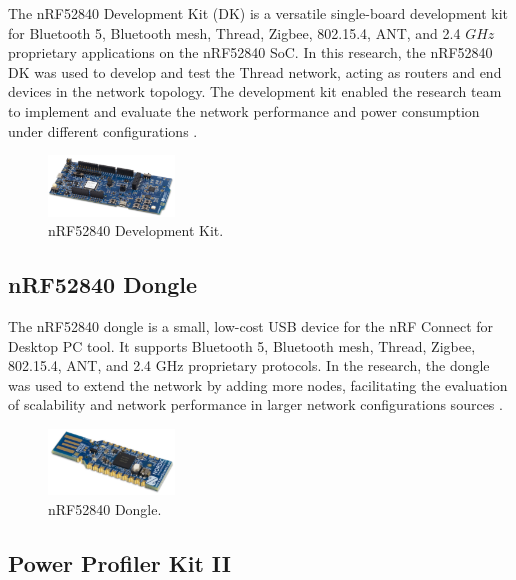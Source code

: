 The nRF52840 Development Kit (DK) is a versatile single-board development kit for Bluetooth 5, Bluetooth mesh, Thread, Zigbee, 802.15.4, ANT, and 2.4 $GHz$ proprietary applications on the nRF52840 SoC. In this research, the nRF52840 DK was used to develop and test the Thread network, acting as routers and end devices in the network topology. The development kit enabled the research team to implement and evaluate the network performance and power consumption under different configurations \cite{Semiconductor_Nordic_Product_Brief_2018_2.0}.

\begin{figure}[H]
    \centering
    \includegraphics[width=0.3\textwidth]{images/situational_theoretical_analysis/nRF52840_DK.png}
    \caption{nRF52840 Development Kit.}
    \label{fig:nRF52840_DK}
\end{figure}

\subsection{nRF52840 Dongle}

The nRF52840 dongle is a small, low-cost USB device for the nRF Connect for Desktop PC tool. It supports Bluetooth 5, Bluetooth mesh, Thread, Zigbee, 802.15.4, ANT, and 2.4 GHz proprietary protocols. In the research, the dongle was used to extend the network by adding more nodes, facilitating the evaluation of scalability and network performance in larger network configurations sources \cite{Semiconductor_Nordic_Dongle_Brief_2018_2.0}.

\begin{figure}[H]
    \centering
    \includegraphics[width=0.3\textwidth]{images/situational_theoretical_analysis/nRF52840_Dongle.png}
    \caption{nRF52840 Dongle.}
    \label{fig:nRF52840_dongle}
\end{figure}

\subsection{Power Profiler Kit II}


